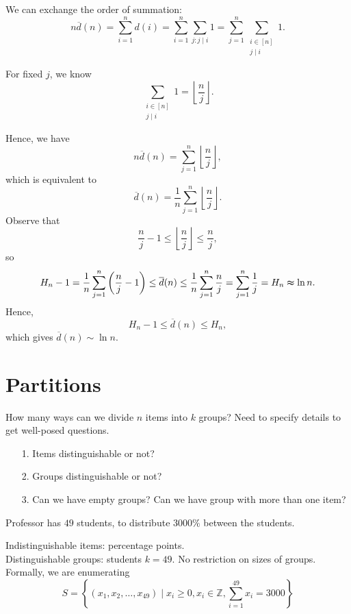 We can exchange the order of summation: 
\[
    n \overline{d}(n) = \sum_{i=1}^n d(i) = \sum_{i=1}^n \sum_{j: j \mid i} 1 = \sum_{j=1}^n \sum_{\substack{i \in [n] \\ j \mid i}} 1.
\]

For fixed \(j\), we know 
\[
    \sum_{\substack{i \in [n] \\ j \mid i}} 1 = \left\lfloor \frac{n}{j} \right\rfloor.
\] 

Hence, we have 
\[
    n \overline{d}(n) = \sum_{j=1}^n \left\lfloor \frac{n}{j} \right\rfloor,
\] which is equivalent to 
\[
    \overline{d}(n) = \frac{1}{n}\sum_{j=1}^n \left\lfloor \frac{n}{j} \right\rfloor.
\]
Observe that 
\[
    \frac{n}{j} - 1 \le \left\lfloor \frac{n}{j} \right\rfloor \le \frac{n}{j},
\] so 
\[
     H_n - 1=\frac{1}{n} \sum_{j=1}^n \left( \frac{n}{j} - 1 \right) \le \overline{d}(n) \le \frac{1}{n} \sum_{j=1}^n \frac{n}{j} = \sum_{j=1}^n \frac{1}{j} = H_n \thickapprox \ln n.    
\]
Hence, 
\[
    H_n - 1 \le \overline{d}(n) \le H_n, 
\]which gives \(\overline{d}(n) \sim \ln n\). 

\chapter{Partitions}
How many ways can we divide \(n\) items into \(k\) groups? Need to specify details to get well-posed questions. 
\begin{itemize}
    \item [1.] Items distinguishable or not?
    \item [2.] Groups distinguishable or not?
    \item [3.] Can we have empty groups? Can we have group with more than one item?
\end{itemize}  

\begin{eg}
    Professor has \(49\) students, to distribute \(3000\%\) between the students. 
\end{eg}
\begin{explanation}
    Indistinguishable items: percentage points. \\
    Distinguishable groups: students \(k=49\). No restriction on sizes of groups. Formally, we are enumerating 
    \[
        S = \left\{ (x_1, x_2, \dots , x_{49}) \mid x_i \ge 0, x_i \in \mathbb{Z} , \sum_{i=1}^{49} x_i = 3000  \right\} 
    \]
\end{explanation}
